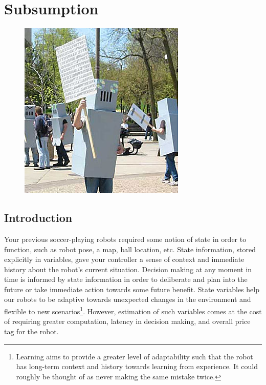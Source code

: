 
\chapter{Subsumption}
\label{sec:subsumption}

\begin{figure}[!h]
\centering
\includegraphics[width=0.8\columnwidth]{figures/9_robots.jpg}
\end{figure}

\newpage

\section{Introduction}

\noindent Your previous soccer-playing robots required some notion of state in order to function, such as robot pose, a map, ball location, etc.  State information, stored explicitly in variables, gave your controller a sense of context and immediate history about the robot's current situation.  Decision making at any moment in time is informed by state information in order to deliberate and plan into the future or take immediate action towards some future benefit.  State variables help our robots to be adaptive towards unexpected changes in the environment and flexible to new scenarios\footnote{Learning aims to provide a greater level of adaptability such that the robot has long-term context and history towards learning from experience.  It could roughly be thought of as never making the same mistake twice.}.  However, estimation of such variables comes at the cost of requiring greater computation, latency in decision making, and overall price tag for the robot.

